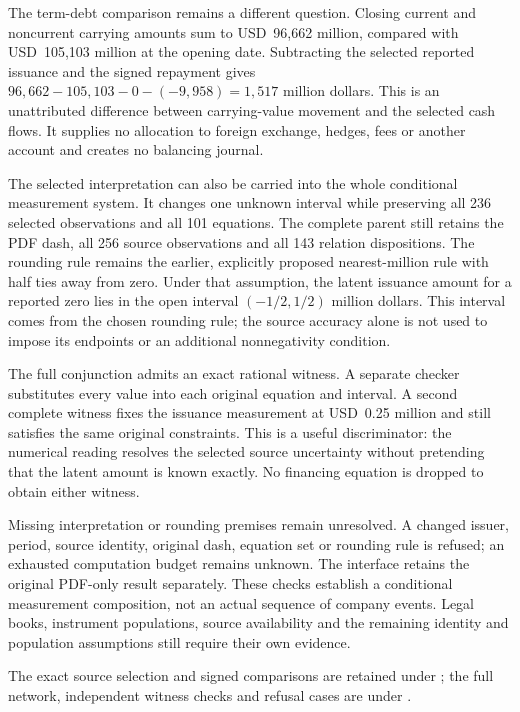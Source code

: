 The term-debt comparison remains a different question. Closing current and
noncurrent carrying amounts sum to USD~96,662 million, compared with
USD~105,103 million at the opening date. Subtracting the selected reported
issuance and the signed repayment gives
\(96{,}662-105{,}103-0-(-9{,}958)=1{,}517\) million dollars.
This is an unattributed difference between carrying-value movement and the
selected cash flows. It supplies no allocation to foreign exchange, hedges,
fees or another account and creates no balancing journal.

The selected interpretation can also be carried into the whole conditional
measurement system. It changes one unknown interval while preserving all
236 selected observations and all 101 equations. The complete parent still
retains the PDF dash, all 256 source observations and all 143 relation
dispositions. The rounding rule remains the earlier, explicitly proposed
nearest-million rule with half ties away from zero. Under that assumption,
the latent issuance amount for a reported zero lies in the open interval
\((-1/2,1/2)\) million dollars. This interval comes from the chosen rounding
rule; the source accuracy alone is not used to impose its endpoints or an
additional nonnegativity condition.

The full conjunction admits an exact rational witness. A separate checker
substitutes every value into each original equation and interval. A second
complete witness fixes the issuance measurement at USD~0.25 million and
still satisfies the same original constraints. This is a useful discriminator:
the numerical reading resolves the selected source uncertainty without
pretending that the latent amount is known exactly. No financing equation is
dropped to obtain either witness.

Missing interpretation or rounding premises remain unresolved. A changed
issuer, period, source identity, original dash, equation set or rounding rule
is refused; an exhausted computation budget remains unknown. The interface
retains the original PDF-only result separately. These checks establish a
conditional measurement composition, not an actual sequence of company events.
Legal books, instrument populations, source availability and the remaining
identity and population assumptions still require their own evidence.

The exact source selection and signed comparisons are retained under
; the full network,
independent witness checks and refusal cases are under
.

